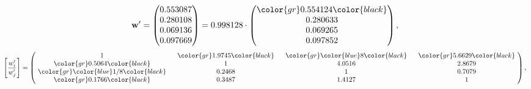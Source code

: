 \begin{example}
\begin{equation*}
\mathbf{w}^{\prime} =
\begin{pmatrix}
0.553087\\
0.280108\\
0.069136\\
0.097669
\end{pmatrix} =
0.998128\cdot
\begin{pmatrix}
\color{gr} 0.554124\color{black} \\
0.280633\\
0.069265\\
0.097852
\end{pmatrix},
\end{equation*}
\begin{equation*}
\left[ \frac{{w}^{\prime}_i}{{w}^{\prime}_j} \right] =
\begin{pmatrix}
$\,\,$ 1 $\,\,$ & $\,\,$\color{gr} 1.9745\color{black} $\,\,$ & $\,\,$\color{gr} \color{blue} 8\color{black} $\,\,$ & $\,\,$\color{gr} 5.6629\color{black} $\,\,$ \\
$\,\,$\color{gr} 0.5064\color{black} $\,\,$ & $\,\,$ 1 $\,\,$ & $\,\,$4.0516$\,\,$ & $\,\,$2.8679  $\,\,$ \\
$\,\,$\color{gr} \color{blue}  1/8\color{black} $\,\,$ & $\,\,$0.2468$\,\,$ & $\,\,$ 1 $\,\,$ & $\,\,$0.7079 $\,\,$ \\
$\,\,$\color{gr} 0.1766\color{black} $\,\,$ & $\,\,$0.3487$\,\,$ & $\,\,$1.4127$\,\,$ & $\,\,$ 1  $\,\,$ \\
\end{pmatrix},
\end{equation*}
\end{example}
\newpage
